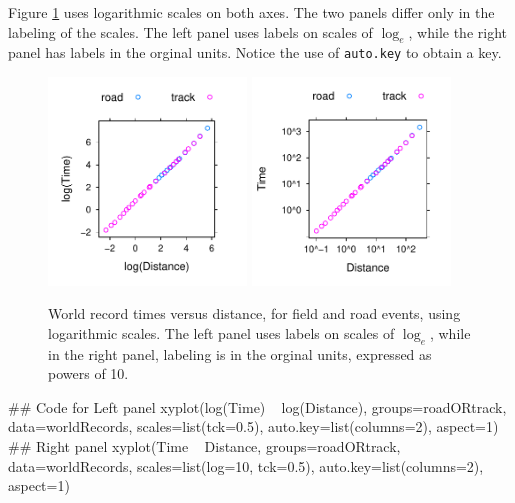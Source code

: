 \documentclass{tufte-book}\usepackage[]{graphicx}\usepackage[]{color}
\newcommand{\txtt}[1]{\texttt{#1}}
\begin{document}
Figure \ref{fig:wrlog} uses logarithmic scales on both axes.  The two
panels differ only in the labeling of the scales.  The left panel uses
labels on scales of $\log_e$, while the right panel has labels in the
orginal units.  Notice the use of
\txtt{auto.key} to obtain a key.

\begin{figure}
\begin{Schunk}


\centerline{\includegraphics[width=0.47\textwidth]{figs/03-wrTimesAB-1} \includegraphics[width=0.47\textwidth]{figs/03-wrTimesAB-2} }

\end{Schunk}
\caption{World record times versus distance, for field and road
  events, using logarithmic scales.  The left panel uses labels on
  scales of $\log_e$, while in the right panel, labeling is in the
  orginal units, expressed as powers of 10.}
\label{fig:wrlog}
\end{figure}

\begin{Schunk}
\begin{Sinput}
## Code for Left panel
xyplot(log(Time) ~ log(Distance),
       groups=roadORtrack, data=worldRecords,
       scales=list(tck=0.5),
       auto.key=list(columns=2), aspect=1)
## Right panel
xyplot(Time ~ Distance, groups=roadORtrack,
       data=worldRecords,
       scales=list(log=10, tck=0.5),
       auto.key=list(columns=2), aspect=1)
\end{Sinput}
\end{Schunk}
\vspace*{-9pt}
\end{document}
